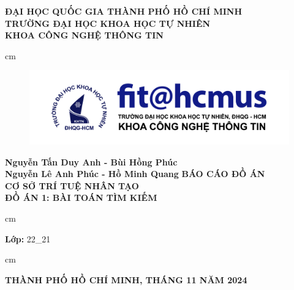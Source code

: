 \begin{titlepage}
	\begin{mybox}
		\begin{center}
			\fontsize{12}{12}\selectfont
			\textbf{ĐẠI HỌC QUỐC GIA THÀNH PHỐ HỒ CHÍ MINH}\\
			\textbf{TRƯỜNG ĐẠI HỌC KHOA HỌC TỰ NHIÊN}\\
			\textbf{KHOA CÔNG NGHỆ THÔNG TIN}
		\end{center}
		 cm
		\begin{figure}[H]
			\begin{center}
				\includegraphics[scale=0.5]{figures/fit-logo-chuan-V3}
				\label{fig:fit-logo}
			\end{center}
		\end{figure}
		\begin{center}
			\fontsize{16}{12}\selectfont
			\textbf{Nguyễn Tấn Duy Anh - Bùi Hồng Phúc\\ Nguyễn Lê Anh Phúc - Hồ Minh Quang}
			\vskip 1.75cm
			\textbf{BÁO CÁO ĐỒ ÁN}\\
			\fontsize{24}{20}\selectfont
			\textbf{CƠ SỞ TRÍ TUỆ NHÂN TẠO}\\
			\fontsize{16}{12}\selectfont
			\textbf{ĐỒ ÁN 1: BÀI TOÁN TÌM KIẾM}
		\end{center}
		 cm
		\fontsize{14}{12}\selectfont
		\begin{center}
			\textbf{Lớp:} 22\_21
		\end{center}
		 cm
		\begin{center}
			\textbf{THÀNH PHỐ HỒ CHÍ MINH, THÁNG 11 NĂM 2024}
		\end{center}
	\end{mybox}
	
	\pagebreak
	\thispagestyle{empty}
	

\end{titlepage}
